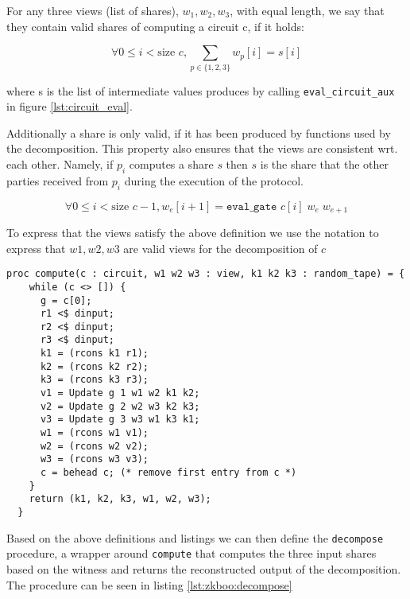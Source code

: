 \begin{definition}
  \label{def:decomp:valid_view}
  For any three views (list of shares), $w_{1}, w_{2}, w_{3}$, with equal length, we
  say that they contain valid shares of computing a circuit c, if it holds:

  \begin{equation}
    \label{eq:decomp:view:sum}
    \forall 0 \leq i < \text{size } c,
      \sum_{p \in \{1,2,3\}} w_{p}[i] = s[i]
  \end{equation}

  where s is the list of intermediate values produces by calling
  \texttt{eval\_circuit\_aux} in figure \ref{lst:circuit_eval}.

  Additionally a share is only valid, if it has been produced by functions used
  by the decomposition. This property also ensures that the views are consistent wrt. each other. Namely, if $p_{i}$ computes a share $s$ then $s$ is the share that the other parties received from $p_{i}$ during the execution of the protocol.

  \begin{equation}
    \label{eq:decomp:valid}
      \forall 0 \leq i < \text{size
                                                   } c - 1,  w_{e}[i+1] = \texttt{eval\_gate } c[i]\; w_{e} \; w_{e+1}
  \end{equation}

  To express that the views satisfy the above definition we use the notation
   to express that $w1, w2, w3$ are valid views for the
  decomposition of $c$

\end{definition}


\begin{lstlisting}[float,label=lst:decomp_aux,caption= Incremental decomposition procedure]
  proc compute(c : circuit, w1 w2 w3 : view, k1 k2 k3 : random_tape) = {
    while (c <> []) {
      g = c[0];
      r1 <$ dinput;
      r2 <$ dinput;
      r3 <$ dinput;
      k1 = (rcons k1 r1);
      k2 = (rcons k2 r2);
      k3 = (rcons k3 r3);
      v1 = Update g 1 w1 w2 k1 k2;
      v2 = Update g 2 w2 w3 k2 k3;
      v3 = Update g 3 w3 w1 k3 k1;
      w1 = (rcons w1 v1);
      w2 = (rcons w2 v2);
      w3 = (rcons w3 v3);
      c = behead c; (* remove first entry from c *)
    }
    return (k1, k2, k3, w1, w2, w3);
  }
\end{lstlisting}

Based on the above definitions and listings we can then define the \texttt{decompose} procedure, a wrapper around \texttt{compute} that computes the three input shares based on the witness and returns the reconstructed output of the decomposition. The procedure can be seen in listing \ref{lst:zkboo:decompose}

